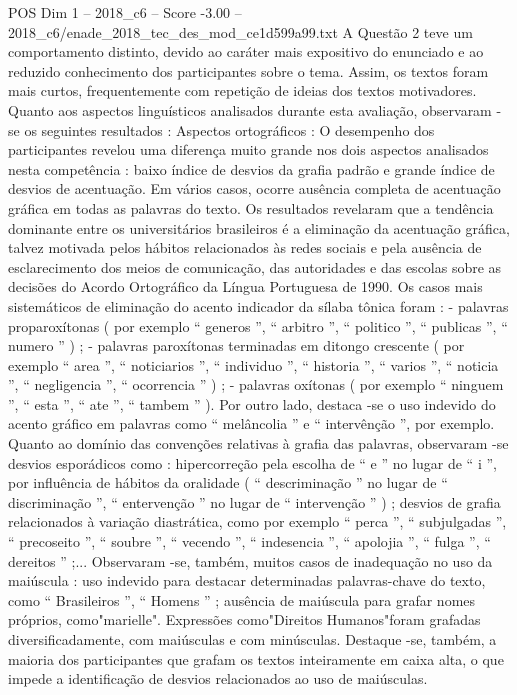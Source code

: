 \begin{textsample}{POS Dim 1 – 2018\_c6 – Score -3.00 – 2018\_c6/enade\_2018\_tec\_des\_mod\_ce1d599a99.txt}
A Questão 2 teve um comportamento distinto, devido ao caráter mais expositivo do enunciado e ao reduzido conhecimento dos participantes sobre o tema.
Assim, os textos foram mais curtos, frequentemente com repetição de ideias dos textos motivadores.
Quanto aos aspectos linguísticos analisados durante esta avaliação, observaram -se os seguintes resultados : Aspectos ortográficos : O desempenho dos participantes revelou uma diferença muito grande nos dois aspectos analisados nesta competência : baixo índice de desvios da grafia padrão e grande índice de desvios de acentuação.
Em vários casos, ocorre ausência completa de acentuação gráfica em todas as palavras do texto.
Os resultados revelaram que a tendência dominante entre os universitários brasileiros é a eliminação da acentuação gráfica, talvez motivada pelos hábitos relacionados às redes sociais e pela ausência de esclarecimento dos meios de comunicação, das autoridades e das escolas sobre as decisões do Acordo Ortográfico da Língua Portuguesa de 1990.
Os casos mais sistemáticos de eliminação do acento indicador da sílaba tônica foram : - palavras proparoxítonas ( por exemplo “ generos ”, “ arbitro ”, “ politico ”, “ publicas ”, “ numero ” ) ; - palavras paroxítonas terminadas em ditongo crescente ( por exemplo “ area ”, “ noticiarios ”, “ individuo ”, “ historia ”, “ varios ”, “ noticia ”, “ negligencia ”, “ ocorrencia ” ) ; - palavras oxítonas ( por exemplo “ ninguem ”, “ esta ”, “ ate ”, “ tambem ” ).
Por outro lado, destaca -se o uso indevido do acento gráfico em palavras como “ melâncolia ” e “ intervênção ”, por exemplo.
Quanto ao domínio das convenções relativas à grafia das palavras, observaram -se desvios esporádicos como : hipercorreção pela escolha de “ e ” no lugar de “ i ”, por influência de hábitos da oralidade ( “ descriminação ” no lugar de “ discriminação ”, “ entervenção ” no lugar de “ intervenção ” ) ; desvios de grafia relacionados à variação diastrática, como por exemplo “ perca ”, “ subjulgadas ”, “ precoseito ”, “ soubre ”, “ vecendo ”, “ indesencia ”, “ apolojia ”, “ fulga ”, “ dereitos ” ;...
Observaram -se, também, muitos casos de inadequação no uso da maiúscula : uso indevido para destacar determinadas palavras-chave do texto, como “ Brasileiros ”, “ Homens ” ; ausência de maiúscula para grafar nomes próprios, como"marielle".
Expressões como"Direitos Humanos"foram grafadas diversificadamente, com maiúsculas e com minúsculas.
Destaque -se, também, a maioria dos participantes que grafam os textos inteiramente em caixa alta, o que impede a identificação de desvios relacionados ao uso de maiúsculas.

\end{textsample}
